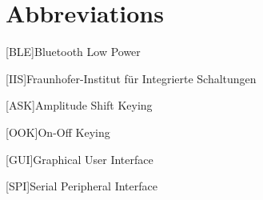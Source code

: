 \chapter*{Abbreviations}
\begin{acronym}
	[BLE]{Bluetooth Low Power}
\end{acronym}

\begin{acronym}
	[IIS]{Fraunhofer-Institut für Integrierte Schaltungen}
\end{acronym}

\begin{acronym}
	[ASK]{Amplitude Shift Keying}
\end{acronym}

\begin{acronym}
	[OOK]{On-Off Keying}
\end{acronym}

\begin{acronym}
	[GUI]{Graphical User Interface}
\end{acronym}

\begin{acronym}
	[SPI]{Serial Peripheral Interface}
\end{acronym}